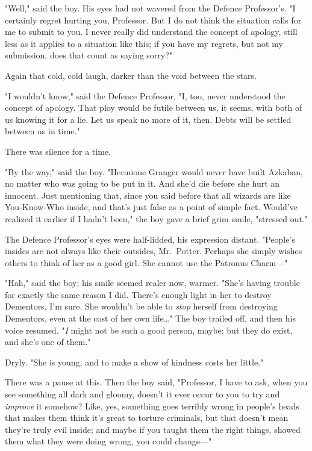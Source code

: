 "Well," said the boy. His eyes had not wavered from the Defence Professor's. "I
certainly regret hurting you, Professor. But I do not think the situation calls
for me to submit to you. I never really did understand the concept of apology,
still less as it applies to a situation like this; if you have my regrets, but
not my submission, does that count as saying sorry?"

Again that cold, cold laugh, darker than the void between the stars.

"I wouldn't know," said the Defence Professor, "I, too, never understood the
concept of apology. That ploy would be futile between us, it seems, with both
of us knowing it for a lie. Let us speak no more of it, then. Debts will be
settled between us in time."

There was silence for a time.

"By the way," said the boy. "Hermione Granger would never have built Azkaban,
no matter who was going to be put in it. And she'd die before she hurt an
innocent. Just mentioning that, since you said before that all wizards are like
You-Know-Who inside, and that's just false as a point of simple fact. Would've
realized it earlier if I hadn't been," the boy gave a brief grim smile,
"stressed out."

The Defence Professor's eyes were half-lidded, his expression distant.
"People's insides are not always like their outsides, Mr.~Potter. Perhaps she
simply wishes others to think of her as a good girl. She cannot use the
Patronus Charm---"

"Hah," said the boy; his smile seemed realer now, warmer. "She's having trouble
for exactly the same reason I did. There's enough light in her to destroy
Dementors, I'm sure. She wouldn't be able to \emph{stop} herself from
destroying Dementors, even at the cost of her own life{\ldots}" The boy trailed
off, and then his voice resumed. "\emph{I} might not be such a good person,
maybe; but they do exist, and she's one of them."

Dryly. "She is young, and to make a show of kindness costs her little."

There was a pause at this. Then the boy said, "Professor, I have to ask, when
you see something all dark and gloomy, doesn't it ever occur to you to try and
\emph{improve} it somehow? Like, yes, something goes terribly wrong in people's
heads that makes them think it's great to torture criminals, but that doesn't
mean they're truly evil inside; and maybe if you taught them the right things,
showed them what they were doing wrong, you could change---"


